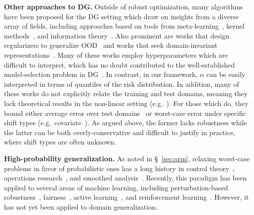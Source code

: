 \documentclass{article}
\begin{document}
%

\textbf{Other approaches to DG.}  Outside of robust optimization, many algorithms have been proposed for the DG setting which draw on insights from a diverse array of fields, including approaches based on tools from meta-learning~\cite{li2018learning,balaji2018metareg,dou2019domain,shu2021open,zhang2020adaptive}, kernel methods~\cite{dubey2021adaptive,deshmukh2019generalization}, and information theory~\cite{ahuja2021invariance}.
%
Also prominent are works that design regularizers to generalize OOD~\cite{zhao2020domain,li2020domain,kim2021selfreg} and works that seek domain-invariant representations~\cite{ganin2016domain,li2018deep,huang2020self}.
%
Many of these works employ hyperparameters which are difficult to
%
interpret, which has no doubt contributed to the well-established model-selection problem in DG~\cite{gulrajani2020search}.  In contrast, in our framework, $\alpha$ can be easily interpreted in terms of quantiles of the risk distribution. 
In addition, many of these works do not explicitly relate the training and test domains, meaning they lack theoretical results in the non-linear setting (e.g.~\cite{su2019one, arjovsky2020invariant, zhang2020adaptive, krueger21rex}). For those which do, they bound either average error over test domains~\citep{blanchard2011generalizing,blanchard2021domain,garg2021learn} or worst-case error under specific shift types (e.g.\ covariate~\citep{robey2021modelbased}).
 As argued above, the former lacks robustness while the latter can be both overly-conservative and difficult to justify in practice, where shift types are often unknown.

%

\textbf{High-probability generalization.}  As noted in \S~\ref{sec:qrm}, relaxing worst-case problems in favor of probabilistic ones has a long history in
%
control theory~\cite{campi2008exact,ramponi2018consistency,tempo2013randomized,lindemann2021stl,lindemann2022temporal}, operations research~\cite{shapiro2021lectures}, and smoothed analysis~\cite{spielman2004smoothed}. Recently, this paradigm 
has been applied to several
%
areas of machine learning, including perturbation-based robustness~\cite{robey2022probabilistically,rice2021robustness}, fairness~\cite{li2020tilted}, active learning~\cite{curi2020adaptive}, and reinforcement learning~\cite{paternain2022safe,chow2017risk}. However, 
%
it has not yet been applied to domain generalization.

%
\end{document}
